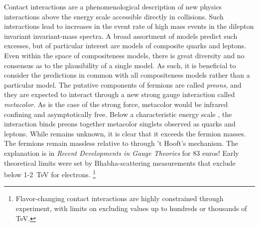 Contact interactions are a phenomenological description of new physics interactions above the energy scale accessible directly in collisions.
Such interactions lead to increases in the event rate of high mass events in the dilepton invariant invariant-mass spectra. 
A broad assortment of models predict such excesses, but of particular interest are models of composite quarks and leptons.
Even within the space of compositeness models, there is great diversity and no consensus as to the plausibility of a single model. 
As such, it is beneficial to consider the predictions in common with all compositeness models rather than a particular model.
The putative components of fermions are called \emph{preons}, and they are expected to interact through a new strong gauge interaction called \emph{metacolor}.
As is the case of the strong force, metacolor would be infrared confining and asymptotically free.
Below a characteristic energy scale \lam, the interaction binds preons together metacolor singlets observed as quarks and leptons.
While \lam remains unknown, it is clear that it exceeds the fermion masses.
The fermions remain massless relative to \lam through 't Hooft's mechanism. \cite{Eichten:1984eu}
{\color{red} The explanation is in \emph{Recent Developments in Gauge Theories} for 83 euros!}
Early theoretical limits were set by Bhabha-scattering measurements that exclude \lam below 1-2~TeV for electrons. \cite{Eichten:1984eu}
\footnote{Flavor-changing contact interactions are highly constrained through experiment, with limits on \lam excluding values up to hundreds or thousands of TeV.\cite{Eichten:1984eu}}

